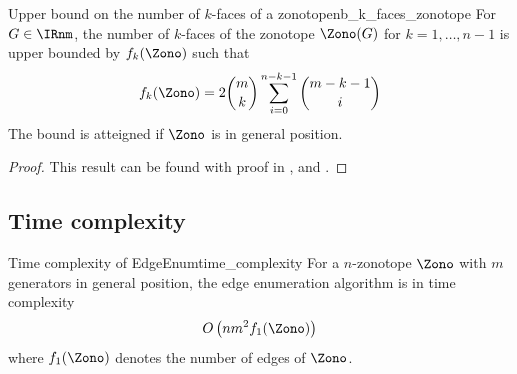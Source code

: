 \begin{lemmabox}{Upper bound on the number of $k$-faces of a zonotope}{nb_k_faces_zonotope}
    For $G\in\IRnm$, the number of $k$-faces of the zonotope $\Zono(G)$ for $k=1,\dots, n-1$ is upper bounded by $f_k(\Zono)$ such that
    $$f_k(\Zono) = 2\binom{m}{k} \sum_{i = 0}^{n-k-1} \binom{m-k-1}{i}$$
    The bound is atteigned if $\Zono$ is in general position.
\end{lemmabox}
\begin{proof}
    This result can be found with proof in \cite{fukudaZonotopeConstructionMinkowski2004a}, \cite{donohoCountingFacesRandomlyProjected2010} and \cite{grunbaumConvexPolytopes2013}.
\end{proof}

\subsection{Time complexity}
\begin{theorembox}{Time complexity of EdgeEnum}{time_complexity}
    For a $n$-zonotope $\Zono$ with $m$ generators in general position, the edge enumeration algorithm is in time complexity
    $$O\left( nm^2f_1(\Zono)\right)$$
    where $f_1(\Zono)$ denotes the number of edges of $\Zono$.
\end{theorembox}
